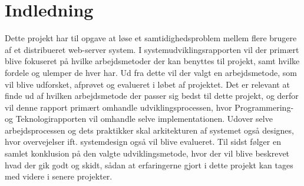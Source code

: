 \chapter{Indledning}\label{ch:indledning}
Dette projekt har til opgave at løse et samtidighedsproblem mellem flere brugere af et distribueret web-server system. I systemudviklingsrapporten vil der primært blive fokuseret på hvilke arbejdsmetoder der kan benyttes til projekt, samt hvilke fordele og ulemper de hver har. Ud fra dette vil der valgt en arbejdsmetode, som vil blive udforsket, afprøvet og evalueret i løbet af projektet. Det er relevant at finde ud af hvilken arbejdsmetode der passer sig bedst til dette projekt, og derfor vil denne rapport primært omhandle udviklingsprocessen, hvor Programmering- og Teknologirapporten vil omhandle selve implementationen. Udover selve arbejdsprocessen og dets praktikker skal arkitekturen af systemet også designes, hvor overvejelser ift. systemdesign også vil blive evalueret. Til sidst følger en samlet konklusion på den valgte udviklingsmetode, hvor der vil blive beskrevet hvad der gik godt og skidt, sådan at erfaringerne gjort i dette projekt kan tages med videre i senere projekter.